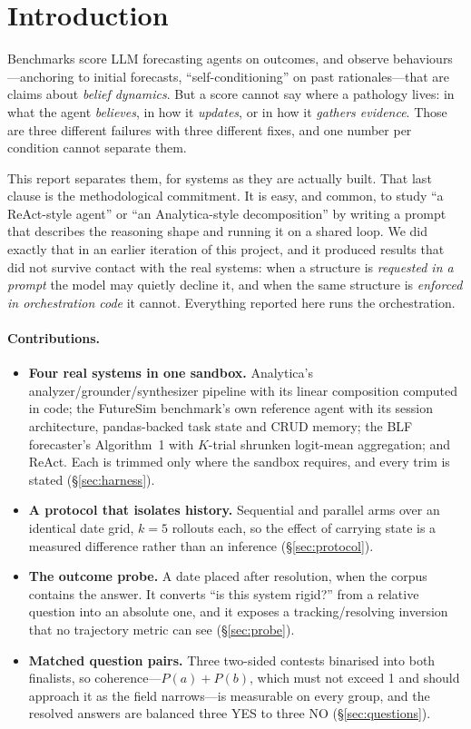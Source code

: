 \documentclass[10pt]{article}
\begin{document}
\section{Introduction}
Benchmarks score LLM forecasting agents on outcomes, and observe behaviours---anchoring to initial
forecasts, ``self-conditioning'' on past rationales---that are claims about \emph{belief dynamics}.
But a score cannot say where a pathology lives: in what the agent \emph{believes}, in how it
\emph{updates}, or in how it \emph{gathers evidence}. Those are three different failures with three
different fixes, and one number per condition cannot separate them.

This report separates them, for systems as they are actually built. That last clause is the
methodological commitment. It is easy, and common, to study ``a ReAct-style agent'' or ``an
Analytica-style decomposition'' by writing a prompt that describes the reasoning shape and running
it on a shared loop. We did exactly that in an earlier iteration of this project, and it produced
results that did not survive contact with the real systems: when a structure is \emph{requested in
a prompt} the model may quietly decline it, and when the same structure is \emph{enforced in
orchestration code} it cannot. Everything reported here runs the orchestration.

\paragraph{Contributions.}
\begin{itemize}
\item \textbf{Four real systems in one sandbox.} Analytica's analyzer/grounder/synthesizer
pipeline with its linear composition computed in code; the FutureSim benchmark's own reference
agent with its session architecture, pandas-backed task state and CRUD memory; the BLF forecaster's
Algorithm~1 with $K$-trial shrunken logit-mean aggregation; and ReAct. Each is trimmed only where
the sandbox requires, and every trim is stated (\S\ref{sec:harness}).
\item \textbf{A protocol that isolates history.} Sequential and parallel arms over an identical
date grid, $k{=}5$ rollouts each, so the effect of carrying state is a measured difference rather
than an inference (\S\ref{sec:protocol}).
\item \textbf{The outcome probe.} A date placed after resolution, when the corpus contains the
answer. It converts ``is this system rigid?'' from a relative question into an absolute one, and
it exposes a tracking/resolving inversion that no trajectory metric can see (\S\ref{sec:probe}).
\item \textbf{Matched question pairs.} Three two-sided contests binarised into both finalists, so
coherence---$P(a)+P(b)$, which must not exceed 1 and should approach it as the field narrows---is
measurable on every group, and the resolved answers are balanced three YES to three NO
(\S\ref{sec:questions}).
\end{itemize}
\end{document}
